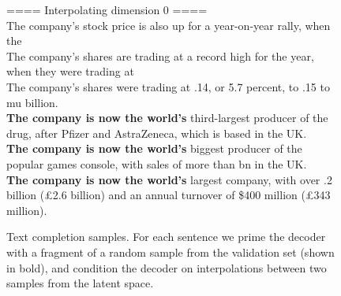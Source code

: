 \documentclass{article} \usepackage{iclr2019_conference,times}
\def\1{\bm{1}}
\begin{document}
\begin{figure}[h!]
\centering
\begin{tcolorbox}

\small
====  Interpolating dimension 0 ====\\
\textup{The company's stock price is also up for a year-on-year rally, when the}\\
\textup{The company's shares are trading at a record high for the year, when they were trading at}\\
\textup{The company's shares were trading at \1.14, or 5.7 percent, to \2.15 to \\mu {} billion.}\\

\textup{
\textbf{The company is now the world's} third-largest producer of the drug, after Pfizer and AstraZeneca, which is based in the UK.}\\

\textup{
\textbf{The company is now the world's} biggest producer of the popular games console, with sales of more than \3bn in the UK.}\\
\textup{
\textbf{The company is now the world's} largest company, with over \4.2 billion (£2.6 billion) and an annual turnover of \$400 million  (£343 million).}\\

\end{tcolorbox}
\caption{Text completion samples. For each sentence we prime the decoder with a fragment of a random sample
from the validation set (shown in bold), and condition the decoder on interpolations between two samples from the latent space.}\label{fig:txtint}
\end{figure}



 
\end{document}
